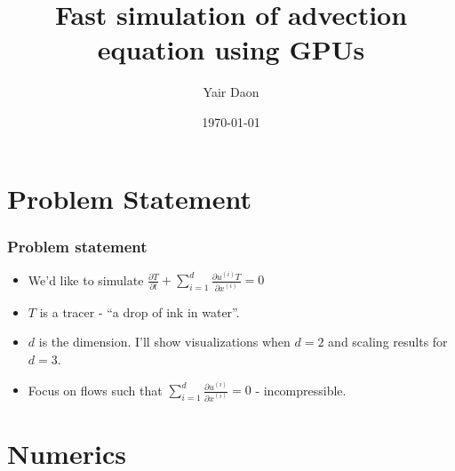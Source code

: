 \documentclass[]{beamer}
\title{Fast simulation of advection equation using GPUs}    %
\author{Yair Daon}                 %
\institute{Courant Institute}      %
\date{\today}                    %
\begin{document}
\begin{frame}
  \titlepage
\end{frame}

\section{Problem Statement}
\begin{frame}
  \frametitle{Problem statement}   %

  \begin{itemize}
  \item We'd like to simulate $\frac{\partial T}{\partial t} + \sum_{i=1}^{d} \frac{\partial u^{(i)}T}{\partial x^{(i)}} = 0$ 
  \item $T$ is a tracer - ``a drop of ink in water''.
  \item $d$ is the dimension. I'll show visualizations when $d=2$ and scaling results for $d=3$.
  \item Focus on flows such that $\sum_{i=1}^{d} \frac{\partial u^{(i)}}{\partial x^{(i)}} = 0$ - incompressible.
  \end{itemize}
\end{frame}



\section{Numerics}
\end{document}
